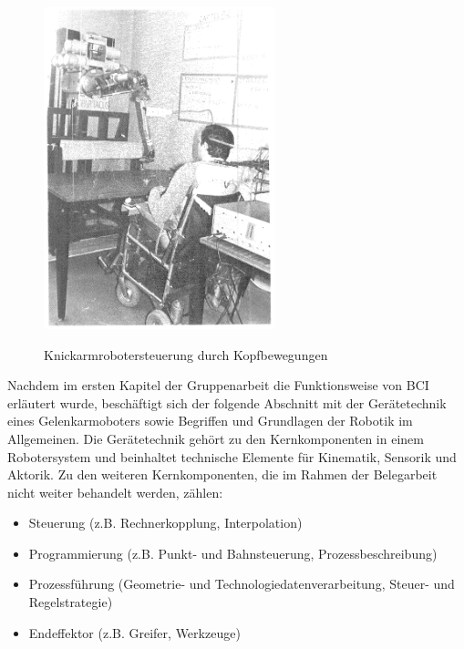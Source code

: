 \documentclass[11pt,ngerman,parskip=half]{scrartcl}
\begin{document}
\begin{figure}[H]
  \centering
  \includegraphics[width=0.6\textwidth]{src/img/spartacus.png}
  \caption{Knickarmrobotersteuerung durch Kopfbewegungen}
  \label{img:spartacus}
  \parencite[][84]{guittet_spartacus_1979}
\end{figure}
\newpage

Nachdem im ersten Kapitel der Gruppenarbeit die Funktionsweise von BCI
erläutert wurde, beschäftigt sich der folgende Abschnitt mit der
Gerätetechnik eines Gelenkarmoboters sowie Begriffen und Grundlagen der
Robotik im Allgemeinen. Die Gerätetechnik gehört zu den Kernkomponenten in
einem Robotersystem und beinhaltet technische Elemente für Kinematik,
Sensorik und Aktorik. Zu den weiteren Kernkomponenten, die im Rahmen der
Belegarbeit nicht weiter behandelt werden, zählen:
\begin{itemize}
  \item Steuerung (z.B. Rechnerkopplung, Interpolation)
  \item Programmierung (z.B. Punkt- und Bahnsteuerung, Prozessbeschreibung)
  \item Prozessführung (Geometrie- und Technologiedatenverarbeitung, Steuer-
        und Regelstrategie)
  \item Endeffektor (z.B. Greifer, Werkzeuge)
\end{itemize}
\parencite[vgl.][40]{hesse_taschenbuch_2016}
\end{document}
